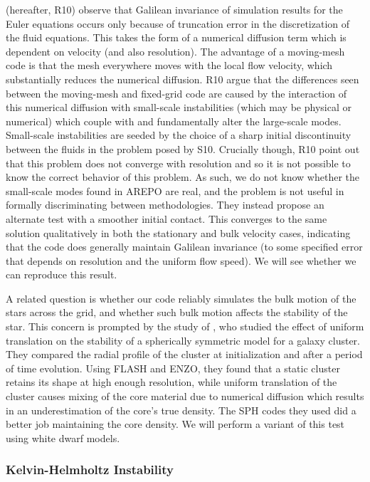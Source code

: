 \documentclass[iop]{emulateapj}
\begin{document}
\citet{robertson:2010} (hereafter, R10) observe that Galilean
invariance of simulation results for the Euler equations occurs only
because of truncation error in the discretization of the fluid
equations. This takes the form of a numerical diffusion term which is
dependent on velocity (and also resolution). The advantage of a
moving-mesh code is that the mesh everywhere moves with the local flow
velocity, which substantially reduces the numerical
diffusion. R10 argue that the differences seen
between the moving-mesh and fixed-grid code are caused by the
interaction of this numerical diffusion with small-scale instabilities
(which may be physical or numerical) which couple with and
fundamentally alter the large-scale modes. Small-scale instabilities
are seeded by the choice of a sharp initial discontinuity between the 
fluids in the problem posed by S10. Crucially though,
R10 point out that this problem does not
converge with resolution and so it is not possible to know the correct
behavior of this problem. As such, we do not know whether the
small-scale modes found in AREPO are real, and the problem is not
useful in formally discriminating between methodologies. They instead
propose an alternate test with a smoother initial contact. This
converges to the same solution qualitatively in both the stationary
and bulk velocity cases, indicating that the code does generally
maintain Galilean invariance (to some specified error that depends on
resolution and the uniform flow speed).  We will see whether we can
reproduce this result.

A related question is whether our code reliably simulates the bulk
motion of the stars across the grid, and whether such bulk motion
affects the stability of the star. This concern is prompted by the
study of \cite{tasker:2008}, who studied the effect of uniform
translation on the stability of a spherically symmetric model for a
galaxy cluster. They compared the radial profile of the cluster at
initialization and after a period of time evolution. Using FLASH and
ENZO, they found that a static cluster retains its shape at high
enough resolution, while uniform translation of the cluster causes
mixing of the core material due to numerical diffusion which results
in an underestimation of the core's true density. The SPH codes they
used did a better job maintaining the core density. We will perform a
variant of this test using white dwarf models.

\subsubsection{Kelvin-Helmholtz Instability}\label{sec:khi}
\end{document}
